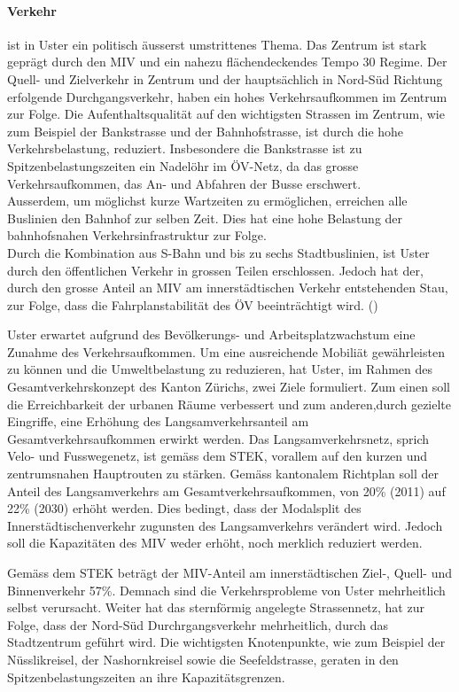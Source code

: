\paragraph{Verkehr} ist in Uster ein politisch äusserst umstrittenes Thema. Das Zentrum ist stark geprägt durch den MIV und ein nahezu flächendeckendes Tempo 30 Regime. Der Quell- und Zielverkehr in Zentrum und der hauptsächlich in Nord-Süd Richtung erfolgende Durchgangsverkehr, haben ein hohes Verkehrsaufkommen im Zentrum zur Folge. Die Aufenthaltsqualität auf den wichtigsten Strassen im Zentrum, wie zum Beispiel der Bankstrasse und der Bahnhofstrasse, ist durch die hohe Verkehrsbelastung, reduziert. Insbesondere die Bankstrasse ist zu Spitzenbelastungszeiten ein Nadelöhr im ÖV-Netz, da das grosse Verkehrsaufkommen, das An- und Abfahren der Busse erschwert. \\
Ausserdem, um möglichst kurze Wartzeiten zu ermöglichen, erreichen alle Buslinien den Bahnhof zur selben Zeit. Dies hat eine hohe Belastung der bahnhofsnahen Verkehrsinfrastruktur zur Folge. \\
Durch die Kombination aus S-Bahn und bis zu sechs Stadtbuslinien, ist Uster durch den öffentlichen Verkehr in grossen Teilen erschlossen. Jedoch hat der, durch den grosse Anteil an MIV am innerstädtischen Verkehr entstehenden Stau, zur Folge, dass die Fahrplanstabilität des ÖV beeinträchtigt wird. (\cite{STEK})

Uster erwartet aufgrund des Bevölkerungs- und Arbeitsplatzwachstum eine Zunahme des Verkehrsaufkommen. Um eine ausreichende Mobiliät gewährleisten zu können und die Umweltbelastung zu reduzieren, hat Uster, im Rahmen des Gesamtverkehrskonzept des Kanton Zürichs, zwei Ziele formuliert. Zum einen soll die Erreichbarkeit der urbanen Räume verbessert und zum anderen,durch gezielte Eingriffe, eine Erhöhung des Langsamverkehrsanteil am Gesamtverkehrsaufkommen erwirkt werden. Das Langsamverkehrsnetz, sprich Velo- und Fusswegenetz, ist gemäss dem STEK, vorallem auf den kurzen und zentrumsnahen Hauptrouten zu stärken. Gemäss kantonalem Richtplan soll der Anteil des Langsamverkehrs am Gesamtverkehrsaufkommen, von 20\% (2011) auf 22\% (2030) erhöht werden. Dies bedingt, dass der Modalsplit des Innerstädtischenverkehr zugunsten des Langsamverkehrs verändert wird. Jedoch soll die Kapazitäten des MIV weder erhöht, noch merklich reduziert werden. 

Gemäss dem STEK beträgt der MIV-Anteil am innerstädtischen Ziel-, Quell- und Binnenverkehr 57\%. Demnach sind die Verkehrsprobleme von Uster mehrheitlich selbst verursacht. Weiter hat das sternförmig angelegte Strassennetz, hat zur Folge, dass der Nord-Süd Durchrgangsverkehr mehrheitlich, durch das Stadtzentrum geführt wird. Die wichtigsten Knotenpunkte, wie zum Beispiel der Nüsslikreisel, der Nashornkreisel sowie die Seefeldstrasse, geraten in den Spitzenbelastungszeiten an ihre Kapazitätsgrenzen.

